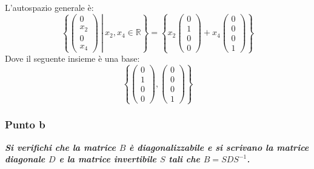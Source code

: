 \documentclass[a4paper]{article}
\begin{document}
	L'autospazio generale è:
	\begin{equation*}
		\left\{
			\left. \begin{pmatrix}
				0		\\
				x_{2} 	\\
				0		\\
				x_{4}
			\end{pmatrix} \: \right| \:
			x_{2}, x_{4} \in \mathbb{R}
		\right\} =
		\left\{
			x_{2} \begin{pmatrix}
				0 \\
				1 \\
				0 \\
				0
			\end{pmatrix}
			+
			x_{4} \begin{pmatrix}
				0 \\
				0 \\
				0 \\
				1
			\end{pmatrix}
		\right\}
	\end{equation*}
	Dove il seguente insieme è una base:
	\begin{equation*}
		\left\{
			\begin{pmatrix}
				0 \\
				1 \\
				0 \\
				0
			\end{pmatrix},
			\begin{pmatrix}
				0 \\
				0 \\
				0 \\
				1
			\end{pmatrix}
		\right\}
	\end{equation*}\newpage

	\subsubsection{Punto b}

	\textcolor{Green4}{\textbf{\emph{Si verifichi che la matrice $B$ è diagonalizzabile e si scrivano la matrice diagonale $D$ e la matrice invertibile $S$ tali che $B = SDS^{-1}$.}}}\newline
\end{document}
